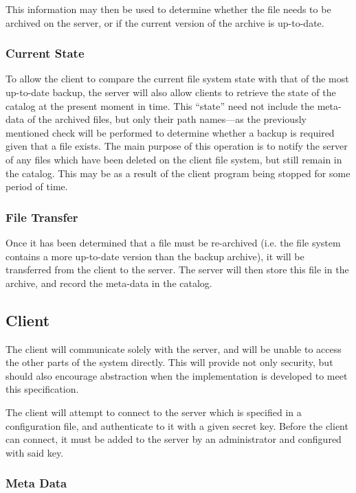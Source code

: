 This information may then be used to determine whether the file needs to be
archived on the server, or if the current version of the archive is up-to-date.

\subsubsection{Current State}

To allow the client to compare the current file system state with that of the
most up-to-date backup, the server will also allow clients to retrieve the
state of the catalog at the present moment in time. This ``state'' need not
include the meta-data of the archived files, but only their path names---as the
previously mentioned check will be performed to determine whether a backup is
required given that a file exists. The main purpose of this operation is to
notify the server of any files which have been deleted on the client file
system, but still remain in the catalog. This may be as a result of the client
program being stopped for some period of time.

\subsubsection{File Transfer}

Once it has been determined that a file must be re-archived (i.e. the file
system contains a more up-to-date version than the backup archive), it will be
transferred from the client to the server. The server will then store this file
in the archive, and record the meta-data in the catalog.

\subsection{Client}

The client will communicate solely with the server, and will be unable to
access the other parts of the system directly. This will provide not only
security, but should also encourage abstraction when the implementation is
developed to meet this specification.

The client will attempt to connect to the server which is specified in
a configuration file, and authenticate to it with a given secret key. Before
the client can connect, it must be added to the server by an administrator and
configured with said key.

\subsubsection{Meta Data}

